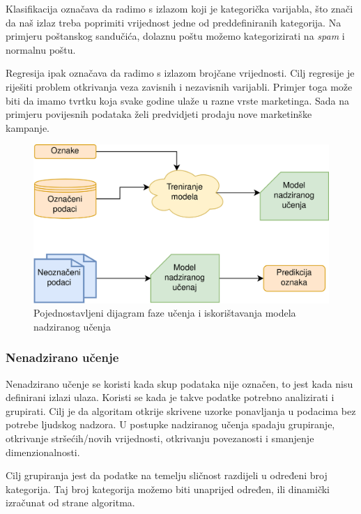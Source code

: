 \documentclass[times, utf8, zavrsni, numeric]{fer}
\begin{document}
Klasifikacija označava da radimo s izlazom koji je kategorička varijabla, što znači da naš izlaz treba poprimiti vrijednost jedne od preddefiniranih kategorija. Na primjeru poštanskog sandučića, dolaznu poštu možemo kategorizirati na \textit{spam} i normalnu poštu.

Regresija ipak označava da radimo s izlazom brojčane vrijednosti. Cilj regresije je riješiti problem otkrivanja veza zavisnih i nezavisnih varijabli. Primjer toga može biti da imamo tvrtku koja svake godine ulaže u razne vrste marketinga. Sada na primjeru povijesnih podataka želi predvidjeti prodaju nove marketinške kampanje.

\begin{figure}[H]
    \centering
    \includegraphics[width=\textwidth]{pictures/nadzirano.png}
    \caption{Pojednostavljeni dijagram faze učenja i iskorištavanja modela nadziranog učenja}
    \label{nadzirano_dijagram}
\end{figure}

\subsubsection{Nenadzirano učenje}

Nenadzirano učenje se koristi kada skup podataka nije označen, to jest kada nisu definirani izlazi ulaza. Koristi se kada je takve podatke potrebno analizirati i grupirati. Cilj je da algoritam otkrije skrivene uzorke ponavljanja u podacima bez potrebe ljudskog nadzora. U postupke nadziranog učenja spadaju grupiranje, otkrivanje stršećih/novih vrijednosti, otkrivanju povezanosti i smanjenje dimenzionalnosti.

Cilj grupiranja jest da podatke na temelju sličnost razdijeli u određeni broj kategorija. Taj broj kategorija možemo biti unaprijed određen, ili dinamički izračunat od strane algoritma.
\end{document}
